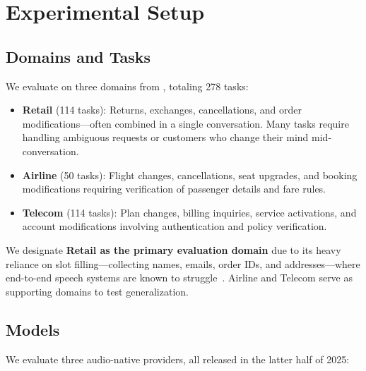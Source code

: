 \section{Experimental Setup}
\label{sec:experiments}

\subsection{Domains and Tasks}

We evaluate on three domains from \tautwobench{}, totaling 278 tasks:
\begin{itemize}[nosep,leftmargin=*]
    \item \textbf{Retail} (114 tasks): Returns, exchanges, cancellations, and order modifications---often combined in a single conversation. Many tasks require handling ambiguous requests or customers who change their mind mid-conversation.
    \item \textbf{Airline} (50 tasks): Flight changes, cancellations, seat upgrades, and booking modifications requiring verification of passenger details and fare rules.
    \item \textbf{Telecom} (114 tasks): Plan changes, billing inquiries, service activations, and account modifications involving authentication and policy verification.
\end{itemize}
We designate \textbf{Retail as the primary evaluation domain} due to its heavy reliance on slot filling---collecting names, emails, order IDs, and addresses---where end-to-end speech systems are known to struggle~\citep{li_cb-whisper_2024, si_spokenwoz_2025}. Airline and Telecom serve as supporting domains to test generalization.

\subsection{Models}

We evaluate three audio-native providers, all released in the latter half of 2025:

\begin{table}[h]
\caption{Audio-native models evaluated.}
\label{tab:models}
\centering
\begin{small}
\end{small}
\end{table}

